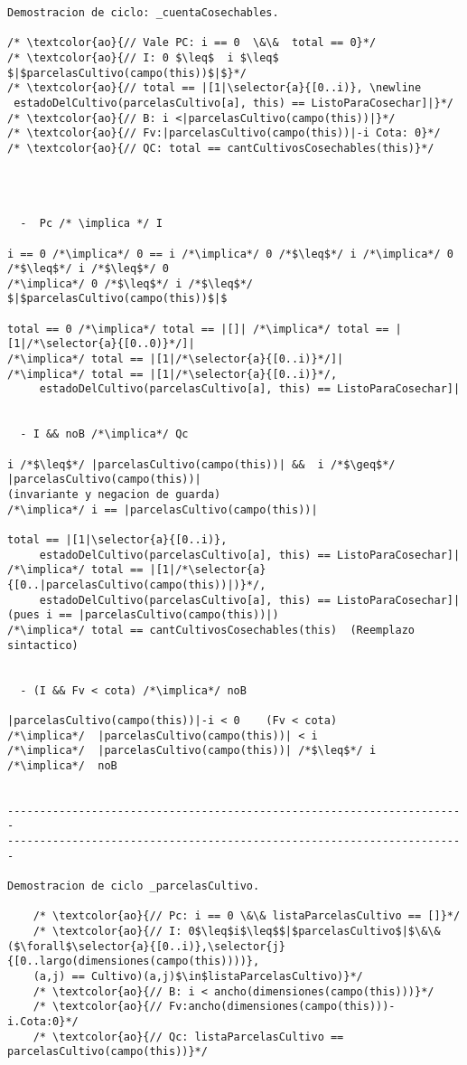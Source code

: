 \begin{lstlisting}
Demostracion de ciclo: _cuentaCosechables.

/* \textcolor{ao}{// Vale PC: i == 0  \&\&  total == 0}*/
/* \textcolor{ao}{// I: 0 $\leq$  i $\leq$ $|$parcelasCultivo(campo(this))$|$}*/
/* \textcolor{ao}{// total == |[1|\selector{a}{[0..i)}, \newline
 estadoDelCultivo(parcelasCultivo[a], this) == ListoParaCosechar]|}*/
/* \textcolor{ao}{// B: i <|parcelasCultivo(campo(this))|}*/
/* \textcolor{ao}{// Fv:|parcelasCultivo(campo(this))|-i Cota: 0}*/
/* \textcolor{ao}{// QC: total == cantCultivosCosechables(this)}*/    




  -  Pc /* \implica */ I
  
i == 0 /*\implica*/ 0 == i /*\implica*/ 0 /*$\leq$*/ i /*\implica*/ 0 /*$\leq$*/ i /*$\leq$*/ 0 
/*\implica*/ 0 /*$\leq$*/ i /*$\leq$*/ $|$parcelasCultivo(campo(this))$|$

total == 0 /*\implica*/ total == |[]| /*\implica*/ total == |[1|/*\selector{a}{[0..0)}*/]|
/*\implica*/ total == |[1|/*\selector{a}{[0..i)}*/]| 
/*\implica*/ total == |[1|/*\selector{a}{[0..i)}*/, 
     estadoDelCultivo(parcelasCultivo[a], this) == ListoParaCosechar]|


  - I && noB /*\implica*/ Qc
  
i /*$\leq$*/ |parcelasCultivo(campo(this))| &&  i /*$\geq$*/ |parcelasCultivo(campo(this))| 
(invariante y negacion de guarda)
/*\implica*/ i == |parcelasCultivo(campo(this))|

total == |[1|\selector{a}{[0..i)}, 
     estadoDelCultivo(parcelasCultivo[a], this) == ListoParaCosechar]|
/*\implica*/ total == |[1|/*\selector{a}{[0..|parcelasCultivo(campo(this))|)}*/,
     estadoDelCultivo(parcelasCultivo[a], this) == ListoParaCosechar]|
(pues i == |parcelasCultivo(campo(this))|)
/*\implica*/ total == cantCultivosCosechables(this)  (Reemplazo sintactico)


  - (I && Fv < cota) /*\implica*/ noB

|parcelasCultivo(campo(this))|-i < 0    (Fv < cota)
/*\implica*/  |parcelasCultivo(campo(this))| < i    
/*\implica*/  |parcelasCultivo(campo(this))| /*$\leq$*/ i
/*\implica*/  noB


-----------------------------------------------------------------------
-----------------------------------------------------------------------

Demostracion de ciclo _parcelasCultivo.

    /* \textcolor{ao}{// Pc: i == 0 \&\& listaParcelasCultivo == []}*/        
    /* \textcolor{ao}{// I: 0$\leq$i$\leq$$|$parcelasCultivo$|$\&\&($\forall$\selector{a}{[0..i)},\selector{j}{[0..largo(dimensiones(campo(this))))},
    (a,j) == Cultivo)(a,j)$\in$listaParcelasCultivo)}*/
    /* \textcolor{ao}{// B: i < ancho(dimensiones(campo(this)))}*/
    /* \textcolor{ao}{// Fv:ancho(dimensiones(campo(this)))-i.Cota:0}*/
    /* \textcolor{ao}{// Qc: listaParcelasCultivo == parcelasCultivo(campo(this))}*/    



\end{lstlisting}
